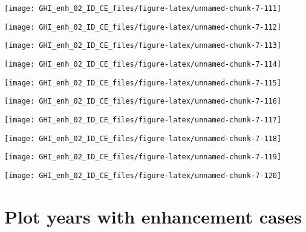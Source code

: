 \documentclass[
  10pt,
  a4paper,oneside]{article}
\begin{document}
\begin{center}\texttt{[image: GHI\_enh\_02\_ID\_CE\_files/figure-latex/unnamed-chunk-7-111]} \end{center}

\begin{center}\texttt{[image: GHI\_enh\_02\_ID\_CE\_files/figure-latex/unnamed-chunk-7-112]} \end{center}

\begin{center}\texttt{[image: GHI\_enh\_02\_ID\_CE\_files/figure-latex/unnamed-chunk-7-113]} \end{center}

\begin{center}\texttt{[image: GHI\_enh\_02\_ID\_CE\_files/figure-latex/unnamed-chunk-7-114]} \end{center}

\begin{center}\texttt{[image: GHI\_enh\_02\_ID\_CE\_files/figure-latex/unnamed-chunk-7-115]} \end{center}

\begin{center}\texttt{[image: GHI\_enh\_02\_ID\_CE\_files/figure-latex/unnamed-chunk-7-116]} \end{center}

\begin{center}\texttt{[image: GHI\_enh\_02\_ID\_CE\_files/figure-latex/unnamed-chunk-7-117]} \end{center}

\begin{center}\texttt{[image: GHI\_enh\_02\_ID\_CE\_files/figure-latex/unnamed-chunk-7-118]} \end{center}

\begin{center}\texttt{[image: GHI\_enh\_02\_ID\_CE\_files/figure-latex/unnamed-chunk-7-119]} \end{center}

\begin{center}\texttt{[image: GHI\_enh\_02\_ID\_CE\_files/figure-latex/unnamed-chunk-7-120]} \end{center}

\FloatBarrier

\hypertarget{plot-years-with-enhancement-cases}{%
\section{Plot years with enhancement cases}\label{plot-years-with-enhancement-cases}}
\end{document}
